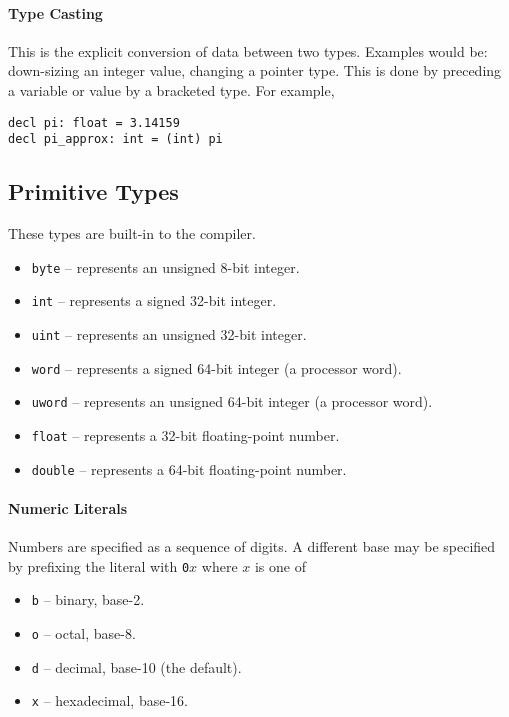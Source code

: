 \documentclass{article}
\begin{document}
\paragraph*{Type Casting}
This is the explicit conversion of data between two types.
Examples would be: down-sizing an integer value, changing a pointer type.
This is done by preceding a variable or value by a bracketed type.
For example,

\begin{lstlisting}[language=CustomLang]
decl pi: float = 3.14159
decl pi_approx: int = (int) pi
\end{lstlisting}

\subsection{Primitive Types}

These types are built-in to the compiler.

\begin{itemize}
    \item \texttt{byte} -- represents an unsigned 8-bit integer.
    \item \texttt{int} -- represents a signed 32-bit integer.
    \item \texttt{uint} -- represents an unsigned 32-bit integer.
    \item \texttt{word} -- represents a signed 64-bit integer (a processor word).
    \item \texttt{uword} -- represents an unsigned 64-bit integer (a processor word).
    \item \texttt{float} -- represents a 32-bit floating-point number.
    \item \texttt{double} -- represents a 64-bit floating-point number.
\end{itemize}

\paragraph*{Numeric Literals}
Numbers are specified as a sequence of digits.
A different base may be specified by prefixing the literal with \texttt{0}\(x\) where \(x\) is one of

\begin{itemize}
    \item \texttt{b} -- binary, base-2.
    \item \texttt{o} -- octal, base-8.
    \item \texttt{d} -- decimal, base-10 (the default).
    \item \texttt{x} -- hexadecimal, base-16.
\end{itemize}
\end{document}
